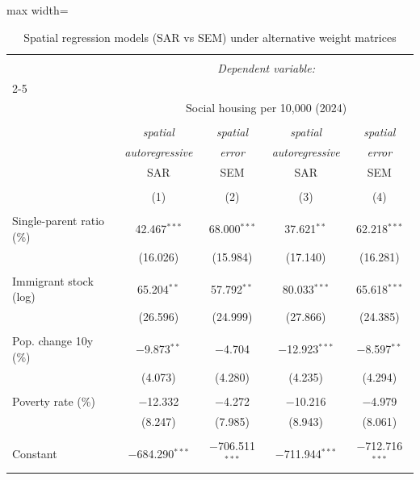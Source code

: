 
\begin{table}[!htbp] \centering 
  \caption{Spatial regression models (SAR vs SEM) under alternative weight matrices} 
  \label{tab:sar_sem} 
\begin{adjustbox}{max width=\linewidth}
\begin{tabular}{@{\extracolsep{5pt}}lcccc} 
\\[-1.8ex]\hline 
\hline \\[-1.8ex] 
 & \multicolumn{4}{c}{\textit{Dependent variable:}} \\ 
\cline{2-5} 
\\[-1.8ex] & \multicolumn{4}{c}{Social housing per 10,000 (2024)} \\ 
\\[-1.8ex] & \textit{spatial} & \textit{spatial} & \textit{spatial} & \textit{spatial} \\ 
 & \textit{autoregressive} & \textit{error} & \textit{autoregressive} & \textit{error} \\ 
 & SAR & SEM & SAR & SEM \\ 
\\[-1.8ex] & (1) & (2) & (3) & (4)\\ 
\hline \\[-1.8ex] 
 Single-parent ratio (\%) & 42.467$^{***}$ & 68.000$^{***}$ & 37.621$^{**}$ & 62.218$^{***}$ \\ 
  & (16.026) & (15.984) & (17.140) & (16.281) \\ 
  & & & & \\ 
 Immigrant stock (log) & 65.204$^{**}$ & 57.792$^{**}$ & 80.033$^{***}$ & 65.618$^{***}$ \\ 
  & (26.596) & (24.999) & (27.866) & (24.385) \\ 
  & & & & \\ 
 Pop. change 10y (\%) & $-$9.873$^{**}$ & $-$4.704 & $-$12.923$^{***}$ & $-$8.597$^{**}$ \\ 
  & (4.073) & (4.280) & (4.235) & (4.294) \\ 
  & & & & \\ 
 Poverty rate (\%) & $-$12.332 & $-$4.272 & $-$10.216 & $-$4.979 \\ 
  & (8.247) & (7.985) & (8.943) & (8.061) \\ 
  & & & & \\ 
 Constant & $-$684.290$^{***}$ & $-$706.511$^{***}$ & $-$711.944$^{***}$ & $-$712.716$^{***}$ \\ 

\end{tabular}
\end{adjustbox}
\end{table}
